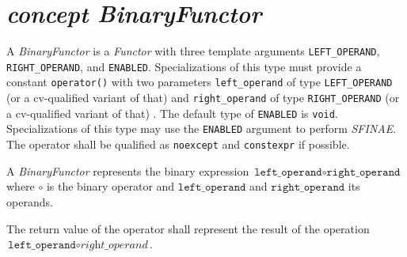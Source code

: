 \section{\textit{concept BinaryFunctor}}
A \textit{BinaryFunctor} is a \textit{Functor} with three template arguments
\verb+LEFT_OPERAND+,
\verb+RIGHT_OPERAND+,
and
\verb+ENABLED+.
Specializations of this type must provide a constant \verb+operator()+ with two parameters
\verb+left_operand+  of type \verb+LEFT_OPERAND+  (or a cv-qualified variant of that)
and
\verb+right_operand+ of type \verb+RIGHT_OPERAND+ (or a cv-qualified variant of that)
. The default type of \verb+ENABLED+ is \verb+void+. Specializations of this type may
use     the \verb+ENABLED+ argument to perform \textit{SFINAE}. The operator shall be
qualified as \texttt{noexcept} and \texttt{constexpr} if possible. \newline

\noindent{}A \textit{BinaryFunctor} represents the binary expression $\texttt{left\_operand} \circ \texttt{right\_operand}$
where $\circ$ is the binary operator    and $\texttt{left\_operand}$ and $\texttt{right\_operand}$ its operands. \newline

\noindent{}The return value of the operator shall represent the result of the operation $\texttt{left\_operand} \circ \textit{right\_operand}$.
